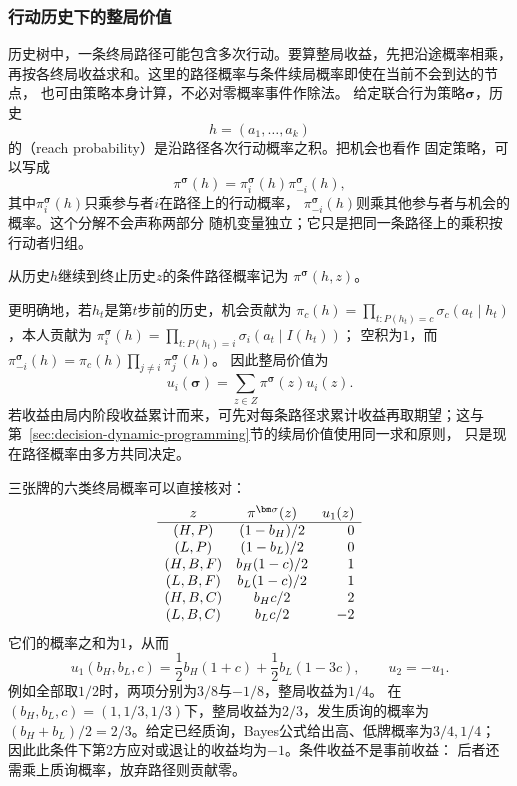 \subsubsection{行动历史下的整局价值}
\label{sec:game-history-value}

历史树中，一条终局路径可能包含多次行动。要算整局收益，先把沿途概率相乘，
再按各终局收益求和。这里的路径概率与条件续局概率即使在当前不会到达的节点，
也可由策略本身计算，不必对零概率事件作除法。
给定联合行为策略\(\bm{\sigma}\)，历史
\[
  h=(a_1,\ldots,a_k)
\]
的（reach probability）是沿路径各次行动概率之积。把机会也看作
固定策略，可以写成
\begin{equation}
  \pi^{\bm{\sigma}}(h)
  =
  \pi_i^{\bm{\sigma}}(h)
  \pi_{-i}^{\bm{\sigma}}(h),
  \label{eq:game-reach-factorization}
\end{equation}
其中\(\pi_i^{\bm{\sigma}}(h)\)只乘参与者\(i\)在路径上的行动概率，
\(\pi_{-i}^{\bm{\sigma}}(h)\)则乘其他参与者与机会的概率。这个分解不会声称两部分
随机变量独立；它只是把同一条路径上的乘积按行动者归组。

从历史\(h\)继续到终止历史\(z\)的条件路径概率记为
\(\pi^{\bm{\sigma}}(h,z)\)。

更明确地，若\(h_t\)是第\(t\)步前的历史，机会贡献为
\(\pi_c(h)=\prod_{t:P(h_t)=c}\sigma_c(a_t\mid h_t)\)，本人贡献为
\(\pi_i^{\bm\sigma}(h)=\prod_{t:P(h_t)=i}\sigma_i(a_t\mid I(h_t))\)；
空积为\(1\)，而\(\pi_{-i}^{\bm\sigma}(h)=\pi_c(h)\prod_{j\ne i}\pi_j^{\bm\sigma}(h)\)。
因此整局价值为
\begin{equation}
  u_i(\bm\sigma)=\sum_{z\in Z}\pi^{\bm\sigma}(z)u_i(z).
  \label{eq:game-terminal-payoff}
\end{equation}
若收益由局内阶段收益累计而来，可先对每条路径求累计收益再取期望；这与
第~\ref{sec:decision-dynamic-programming}节的续局价值使用同一求和原则，
只是现在路径概率由多方共同决定。

三张牌的六类终局概率可以直接核对：
\[
\begin{array}{c@{\quad}c@{\quad}r}
 z&\pi^{\bm\sigma}(z)&u_1(z)\\ \hline
 (H,P)&(1-b_H)/2&0\\
 (L,P)&(1-b_L)/2&0\\
 (H,B,F)&b_H(1-c)/2&1\\
 (L,B,F)&b_L(1-c)/2&1\\
 (H,B,C)&b_Hc/2&2\\
 (L,B,C)&b_Lc/2&-2
\end{array}
\]
它们的概率之和为\(1\)，从而
\begin{equation}
  u_1(b_H,b_L,c)
  =\frac12 b_H(1+c)+\frac12 b_L(1-3c),
  \qquad u_2=-u_1.
  \label{eq:game-card-behavior-payoff}
\end{equation}
例如全部取\(1/2\)时，两项分别为\(3/8\)与\(-1/8\)，整局收益为\(1/4\)。
在\((b_H,b_L,c)=(1,1/3,1/3)\)下，整局收益为\(2/3\)，发生质询的概率为
\((b_H+b_L)/2=2/3\)。给定已经质询，Bayes公式给出高、低牌概率为\(3/4,1/4\)；
因此此条件下第2方应对或退让的收益均为\(-1\)。条件收益不是事前收益：
后者还需乘上质询概率，放弃路径则贡献零。

